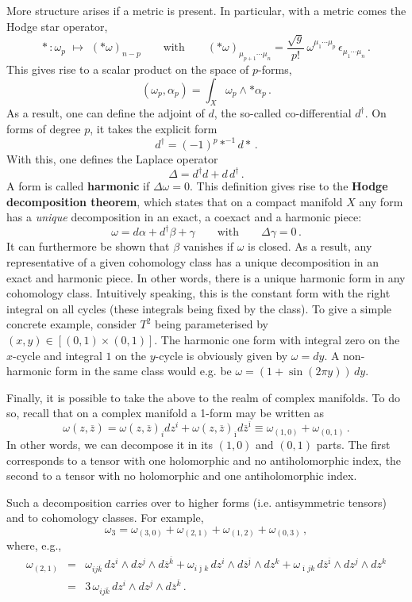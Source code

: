 \documentclass[12pt]{article}
\newcommand{\be}{\begin{equation}}
\newcommand{\ee}{\end{equation}}
\newcommand{\bea}{\begin{eqnarray}}
\newcommand{\eea}{\end{eqnarray}}
\newcommand{\ol}{\overline}
\numberwithin{equation}{section}
\begin{document}
More structure arises if a metric is present. In particular, with a metric comes the Hodge star operator, 
\be
*\,:\omega_p\,\,\mapsto\,\,(*\omega)_{n-p}\qquad \mbox{with}\qquad
(*\omega)_{\mu_{p+1}\cdots\mu_n}=\frac{\sqrt{g}}{p!}\,\omega^{\mu_1\cdots \mu_p}\,\epsilon_{\mu_1\cdots \mu_n}\,.
\ee
This gives rise to a scalar product on the space of $p$-forms,
\be
(\omega_p,\alpha_p)=\int_X \omega_p\wedge *\alpha_p\,.
\ee
As a result, one can define the adjoint of $d$, the so-called co-differential $d^\dagger$. On forms of degree $p$, it takes the explicit form
\be
d^\dagger=(-1)^p *^{-1}d*\,.
\ee
With this, one defines the Laplace operator
\be
\Delta = d^\dagger d+d\,d^\dagger\,.
\ee
A form is called {\bf harmonic} if $\Delta\omega=0$. This definition gives rise to the {\bf Hodge decomposition theorem}, which states that on a compact manifold $X$ any form has a {\it unique} decomposition in an exact, a coexact and a harmonic piece: 
\be
\omega=d\alpha+d^\dagger \beta+\gamma\qquad\mbox{with}\qquad \Delta\gamma=0\,.
\ee
It can furthermore be shown that $\beta$ vanishes if $\omega$ is closed. As a result, any representative of a given cohomology class has a unique decomposition in an exact and harmonic piece. In other words, there is a unique harmonic form in any cohomology class. Intuitively speaking, this is the constant form with the right integral on all cycles (these integrals being fixed by the class). To give a simple concrete example, consider $T^2$ being parameterised by $(x,y)\in [(0,1)\times (0,1)]$. The harmonic one form with integral zero on the $x$-cycle and integral $1$ on the $y$-cycle is obviously given by $\omega=dy$. A non-harmonic form in the same class would e.g. be 
$\omega = (1+\sin(2\pi y))\,dy$.

Finally, it is possible to take the above to the realm of complex manifolds. To do so, recall that on a complex manifold a 1-form may be written as 
\be
\omega(z,\ol{z})=\omega(z,\ol{z})_i dz^i+\omega(z,\ol{z})_{\ol{\imath}} d
\ol{z}^{\ol{\imath}}\equiv\omega_{(1,0)}+\omega_{(0,1)}\,.
\ee
In other words, we can decompose it in its $(1,0)$ and $(0,1)$ parts. The first corresponds to a tensor with one holomorphic and no antiholomorphic index, the second to a tensor with no holomorphic and one antiholomorphic index.

Such a decomposition carries over to higher forms (i.e. antisymmetric tensors) and to cohomology classes. For example,
\be
\omega_3 = \omega_{(3,0)}+\omega_{(2,1)}+\omega_{(1,2)}+\omega_{(0,3)}\,,
\ee
where, e.g.,
\bea
\omega_{(2,1)} &=& \omega_{ij\ol{k}}\,dz^i\wedge dz^j\wedge d\ol{z}^{\ol{k}}
+ \omega_{i\ol{\jmath}k}\,dz^i\wedge d\ol{z}^{\ol{\jmath}}\wedge dz^k
+ \omega_{\ol{\imath}jk}\,d\ol{z}^{\ol{\imath}}\wedge dz^j\wedge dz^k
\nonumber \\
&=& 3 \,\omega_{ij\ol{k}}\,dz^i\wedge dz^j\wedge d\ol{z}^{\ol{k}}\,.
\eea
\end{document}
